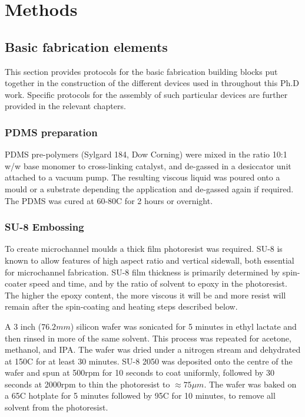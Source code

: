 \chapter{Methods}
\label{chap:methods}



	\section{Basic fabrication elements}
    This section provides protocols for the basic fabrication building blocks put together in the construction of the different devices used in throughout this Ph.D work. Specific protocols for the assembly of such particular devices are further provided in the relevant chapters.

    \label{sec:methods:fabrication}
        \subsection{PDMS preparation}
        PDMS pre-polymers (Sylgard 184, Dow Corning) were mixed in the ratio 10:1 w/w base monomer to cross-linking catalyst, and de-gassed in a desiccator unit attached to a vacuum pump. The resulting viscous liquid was poured onto a mould or a substrate depending the application and de-gassed again if required. The PDMS was cured at 60-80\degree C for 2 hours or overnight.
        \label{sec:methods:PDMSMix}


        \subsection{SU-8 Embossing}
        To create microchannel moulds a thick film photoresist was required. SU-8 is known to allow features of high aspect ratio and vertical sidewall, both essential for microchannel fabrication. SU-8 film thickness is primarily determined by spin-coater speed and time, and by the ratio of solvent to epoxy in the photoresist. The higher the epoxy content, the more viscous it will be and more resist will remain after the spin-coating and heating steps described below.

        A 3 inch (\(76.2mm\)) silicon wafer was sonicated for 5 minutes in ethyl lactate and then rinsed in more of the same solvent. This process was repeated for acetone, methanol, and IPA. The wafer was dried under a nitrogen stream and dehydrated at 150\degree C for at least 30 minutes. SU-8 2050 was deposited onto the centre of the wafer and spun at 500rpm for 10 seconds to coat uniformly, followed by 30 seconds at 2000rpm to thin the photoresist to \(\approx 75\mu m\). The wafer was baked on a 65\degree C hotplate for 5 minutes followed by 95\degree C for 10 minutes, to remove all solvent from the photoresist.

